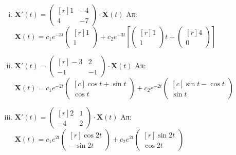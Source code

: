\begin{enumerate}
\begin{enumerate}[i)]
      \item $ \mathbf{X}'(t) = 
        \begin{pmatrix*}[r]
          1 & -4 \\
          4 & -7
        \end{pmatrix*} \cdot
        \mathbf{X}(t) $ 
        \hfill Απ: {\scriptsize $ \mathbf{X}(t) = c_{1}e^{-3t} 
          \begin{pmatrix*}[r] 1 \\ 1 \end{pmatrix*} + c_{2}e^{-3t} \left[
            \begin{pmatrix*}[r] 1 \\ 1 \end{pmatrix*} t + 
        \begin{pmatrix*}[r] 4 \\ 0 \end{pmatrix*}  \right] $}

      \item $ \mathbf{X}'(t) = 
        \begin{pmatrix*}[r]
          -3 & 2 \\
          -1 & -1
        \end{pmatrix*} \cdot 
        \mathbf{X}(t) $
        \hfill Απ: {\scriptsize $ \mathbf{X}(t) = c_{1}e^{-2t} 
          \begin{pmatrix*}[c] \cos{t} + \sin{t} \\ \cos{t} \end{pmatrix*} + c_{2}e^{-2t} 
        \begin{pmatrix*}[c] \sin{t} - \cos{t} \\ \sin{t} \end{pmatrix*} $}

      \item $ \mathbf{X}'(t) = 
        \begin{pmatrix*}[r]
          2 & 1 \\
          -4 & 2
        \end{pmatrix*} \cdot 
        \mathbf{X}(t) $
        \hfill Απ: {\scriptsize $ \mathbf{X}(t) = c_{1}e^{2t} 
          \begin{pmatrix*}[r] \cos{2t} \\ -\sin{2t} \end{pmatrix*} + c_{2}e^{2t} 
        \begin{pmatrix*}[r] \sin{2t} \\ \cos{2t}  \end{pmatrix*} $}
    \end{enumerate}


\end{enumerate}
